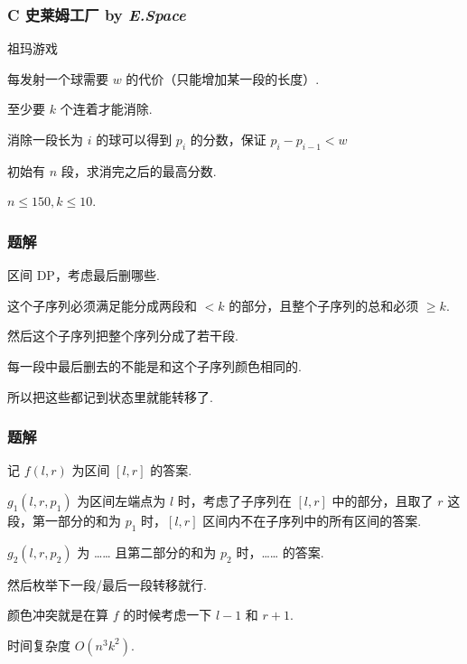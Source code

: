 \frame
{
  \frametitle{C 史莱姆工厂 {by \itshape E.Space}}

 	祖玛游戏

	每发射一个球需要 $w$ 的代价（只能增加某一段的长度）.

	至少要 $k$ 个连着才能消除.

	消除一段长为 $i$ 的球可以得到 $p_i$ 的分数，保证 $p_i-p_{i-1}<w$

	初始有 $n$ 段，求消完之后的最高分数.

	$n\le 150,k\le 10$.

}

\frame
{
    \frametitle{题解}

	区间 DP，考虑最后删哪些.

	这个子序列必须满足能分成两段和 $<k$ 的部分，且整个子序列的总和必须 $\ge k$.

	然后这个子序列把整个序列分成了若干段.

	每一段中最后删去的不能是和这个子序列颜色相同的.

	所以把这些都记到状态里就能转移了.

}

\frame
{
    \frametitle{题解}

    记 $f(l,r)$ 为区间 $[l,r]$ 的答案.

	$g_1(l,r,p_1)$ 为区间左端点为 $l$ 时，考虑了子序列在 $[l,r]$ 中的部分，且取了 $r$ 这段，第一部分的和为 $p_1$ 时，$[l,r]$ 区间内不在子序列中的所有区间的答案.

	$g_2(l,r,p_2)$ 为 …… 且第二部分的和为 $p_2$ 时，…… 的答案.

	然后枚举下一段/最后一段转移就行.

	颜色冲突就是在算 $f$ 的时候考虑一下 $l-1$ 和 $r+1$.

	时间复杂度 $O(n^3k^2)$.

}